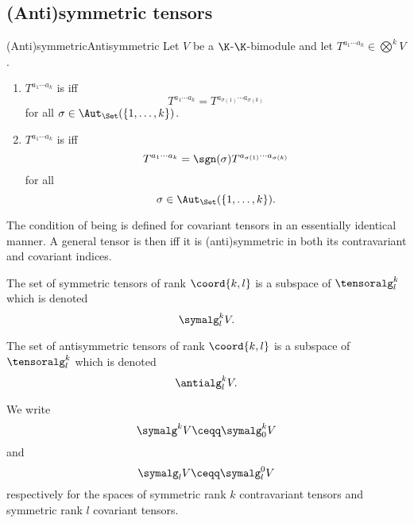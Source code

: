 \subsection{(Anti)symmetric tensors}

\begin{dfn}{(Anti)symmetric}{Antisymmetric}
	Let $V$ be a $\K$-$\K$-bimodule and let $T^{a_1\cdots a_k}\in \bigotimes ^kV$.
	\begin{enumerate}
		\item $T^{a_1\cdots a_k}$ is  iff
		\begin{equation}
		T^{a_1\cdots a_k}=T^{a_{\sigma (1)}\cdots a_{\sigma (k)}}
		\end{equation}
		for all $\sigma \in \Aut _{\Set}(\{ 1,\ldots ,k\} )$.
		\item $T^{a_1\cdots a_k}$ is  iff
		\begin{equation}
		T^{a_1\cdots a_k}=\sgn (\sigma )T^{a_{\sigma (1)}\cdots a_{\sigma (k)}}
		\end{equation}
		for all
		\begin{equation}
		\sigma \in \Aut _{\Set}(\{ 1,\ldots ,k\}).
		\end{equation}
	\end{enumerate}
	\begin{rmk}
		The condition of being  is defined for covariant tensors in an essentially identical manner.  A general tensor is then  iff it is (anti)symmetric in both its contravariant and covariant indices.
	\end{rmk}
	\begin{rmk}
		The set of symmetric tensors of rank $\coord{k,l}$ is a subspace of $\tensoralg _l^k$ which is denoted
		\begin{equation}
		\symalg _l^kV.
		\end{equation}\index[notation]{$\symalg _l^kV$}
		
		The set of antisymmetric tensors of rank $\coord{k,l}$ is a subspace of $\tensoralg _l^k$ which is denoted
		\begin{equation}
		\antialg _l^kV.
		\end{equation}\index[notation]{$\antialg _l^kV$}
	\end{rmk}
	\begin{rmk}
		We write
		\begin{equation}
		\symalg ^kV\ceqq \symalg _0^kV
		\end{equation}\index[notation]{$\symalg ^kV$}
		and
		\begin{equation}
		\symalg _lV\ceqq \symalg _l^0V
		\end{equation}\index[notation]{$\symalg _lV$}
		respectively for the spaces of symmetric rank $k$ contravariant tensors and symmetric rank $l$ covariant tensors.
		

\end{rmk}
\end{dfn}
